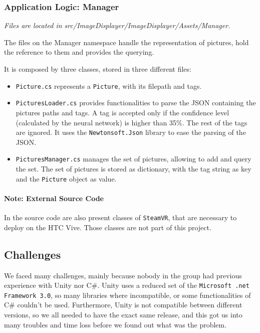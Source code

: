 \documentclass[11pt,a4paper]{article}
\begin{document}
\subsubsection{Application Logic: Manager}
\textit{Files are located in src/ImageDisplayer/ImageDisplayer/Assets/Manager.}

The files on the Manager namespace handle the representation of pictures, hold the reference to them and provides the querying.

It is composed by three classes, stored in three different files:
\begin{itemize}
\item \texttt{Picture.cs} represents a \texttt{Picture}, with its filepath and tags.
\item \texttt{PicturesLoader.cs} provides functionalities to parse the JSON containing the pictures paths and tags. 
A tag is accepted only if the confidence level (calculated by the neural network) is higher than 35$\%$.
The rest of the tags are ignored.
It uses the \texttt{Newtonsoft.Json} library to ease the parsing of the JSON.
\item \texttt{PicturesManager.cs} manages the set of pictures, allowing to add and query the set. The set of pictures is stored as dictionary, with the tag string as key and the \texttt{Picture} object as value.
\end{itemize}

\paragraph{Note: External Source Code}
In the source code are also present classes of \texttt{SteamVR}, that are necessary to deploy on the HTC Vive.
Those classes are not part of this project.

\subsection{Challenges}







We faced many challenges, mainly because nobody in the group had previous experience with Unity nor C$\#$.
Unity uses a reduced set of the \texttt{Microsoft .net Framework 3.0}, so many libraries where incompatible, or some functionalities of C$\#$ couldn't be used.
Furthermore, Unity is not compatible between different versions, so we all needed to have the exact same release, and this got us into many troubles and time loss before we found out what was the problem.
\end{document}
